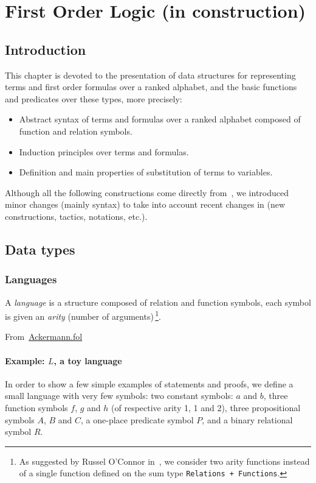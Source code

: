 \chapter{First Order Logic (in construction)}
\label{chap:fol}

\section{Introduction}

This chapter is devoted to the presentation of  data structures for representing terms and first order formulas over a ranked alphabet, and the basic functions and predicates over these types, more precisely:

\begin{itemize}
\item Abstract syntax of terms and formulas over a ranked alphabet composed of function and relation symbols.
\item Induction principles over terms and formulas.
\item Definition and main properties of substitution of terms to variables.
\end{itemize}


Although all the following constructions come directly from~\cite{Goedel}, we introduced minor changes (mainly syntax) to
take into account recent changes in \coq(new constructions, tactics, notations, etc.).


\section{Data types}

\subsection{Languages}

A \emph{language} is a structure composed of relation and function symbols, each symbol is given an \emph{arity} (number of arguments)\,\footnote{As suggested by Russel O'Connor in~\cite{OConnor05}, we consider two arity functions instead of a single function defined on the sum type \texttt{Relations + Functions}.}.

From~\href{../theories/html/hydras.Ackermann.fol.html}{Ackermann.fol}


\subsubsection{Example: $L$, a toy language}
In order to show a few simple examples of statements and proofs, we define a small language with very few symbols:
two constant symbols: $a$ and $b$, three function symbols $f$, $g$ and $h$  (of respective arity 1, 1 and 2), three propositional symbols $A$, $B$ and $C$, a one-place predicate symbol $P$, and a binary relational symbol $R$. 
 
